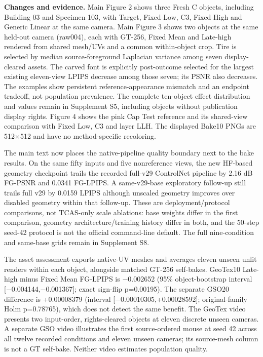 \documentclass[
  10pt,
]{article}
\begin{document}
\textbf{Changes and evidence.} Main Figure 2 shows three Fresh C
objects, including Building 03 and Specimen 103, with Target, Fixed Low,
C3, Fixed High and Generic Linear at the same camera. Main Figure 3
shows two objects at the same held-out camera (raw004), each with
GT-256, Fixed Mean and Late-high rendered from shared mesh/UVs and a
common within-object crop. Tire is selected by median source-foreground
Laplacian variance among seven display-cleared assets. The carved font
is explicitly post-outcome selected for the largest existing eleven-view
LPIPS decrease among those seven; its PSNR also decreases. The examples
show persistent reference-appearance mismatch and an endpoint tradeoff,
not population prevalence. The complete ten-object effect distribution
and values remain in Supplement S5, including objects without
publication display rights. Figure 4 shows the pink Cap Test reference
and its shared-view comparison with Fixed Low, C3 and layer LLH. The
displayed Bake10 PNGs are 512×512 and have no method-specific
recoloring.

The main text now places the native-pipeline quality boundary next to
the bake results. On the same fifty inputs and five nonreference views,
the new HF-based geometry checkpoint trails the recorded full-v29
ControlNet pipeline by 2.16 dB FG-PSNR and 0.0341 FG-LPIPS. A
same-v29-base exploratory follow-up still trails full v29 by 0.0159
LPIPS although unscaled geometry improves over disabled geometry within
that follow-up. These are deployment/protocol comparisons, not TCAS-only
scale ablations: base weights differ in the first comparison, geometry
architecture/training history differ in both, and the 50-step seed-42
protocol is not the official command-line default. The full
nine-condition and same-base grids remain in Supplement S8.

The asset assessment exports native-UV meshes and averages eleven unseen
unlit renders within each object, alongside matched GT-256 self-bakes.
GeoTex10 Late-high minus Fixed Mean FG-LPIPS is −0.002652 (95\%
object-bootstrap interval {[}−0.004144,−0.001367{]}; exact sign-flip
p=0.00195). The separate GSO20 difference is +0.00008379 (interval
{[}−0.00010305,+0.00028592{]}; original-family Holm p=0.78765), which
does not detect the same benefit. The GeoTex video presents two
input-order, rights-cleared objects at eleven discrete unseen cameras. A
separate GSO video illustrates the first source-ordered mouse at seed 42
across all twelve recorded conditions and eleven unseen cameras; its
source-mesh column is not a GT self-bake. Neither video estimates
population quality.
\end{document}

